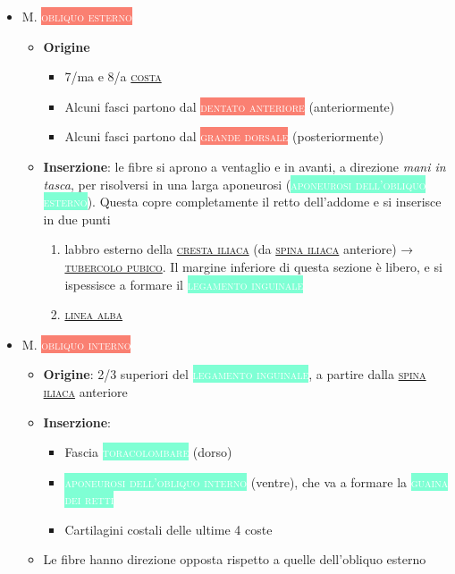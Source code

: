 \documentclass[italian,]{article}
\providecommand{\tightlist}{%
  \setlength{\itemsep}{0pt}\setlength{\parskip}{0pt}}
\newcommand{\mus}[1]{\colorbox{Salmon}{\textcolor{white}{\textsc{#1}}}}
\newcommand{\tol}[1]{\colorbox{Aquamarine}{\textcolor{white}{\textsc{#1}}}}
\renewcommand{\a}[1]{\underline{\textsc{#1}}}
\begin{document}
\begin{itemize}
\tightlist
\item
  M. \mus{obliquo esterno}~

  \begin{itemize}
  \tightlist
  \item
    \textbf{Origine}

    \begin{itemize}
    \tightlist
    \item
      7/ma e 8/a \a{costa}
    \item
      Alcuni fasci partono dal \mus{dentato anteriore} (anteriormente)
    \item
      Alcuni fasci partono dal \mus{grande dorsale} (posteriormente)
    \end{itemize}
  \item
    \textbf{Inserzione}: le fibre si aprono a ventaglio e in avanti, a
    direzione \emph{mani in tasca}, per risolversi in una larga
    aponeurosi (\tol{aponeurosi dell'obliquo esterno}). Questa copre
    completamente il retto dell'addome e si inserisce in due punti

    \begin{enumerate}
    \def\labelenumi{\arabic{enumi}.}
    \tightlist
    \item
      labbro esterno della \a{cresta iliaca} (da \a{spina iliaca}
      anteriore) → \a{tubercolo pubico}. Il margine inferiore di questa
      sezione è libero, e si ispessisce a formare il
      \tol{legamento inguinale}
    \item
      \a{linea alba}~
    \end{enumerate}
  \end{itemize}
\item
  M. \mus{obliquo interno}~

  \begin{itemize}
  \tightlist
  \item
    \textbf{Origine}: 2/3 superiori del \tol{legamento inguinale}, a
    partire dalla \a{spina iliaca} anteriore
  \item
    \textbf{Inserzione}:

    \begin{itemize}
    \tightlist
    \item
      Fascia \tol{toracolombare} (dorso)
    \item
      \tol{aponeurosi dell'obliquo interno} (ventre), che va a formare
      la \tol{guaina dei retti}
    \item
      Cartilagini costali delle ultime 4 coste
    \end{itemize}
  \item
    Le fibre hanno direzione opposta rispetto a quelle dell'obliquo
    esterno
  \end{itemize}
\end{itemize}
\end{document}
